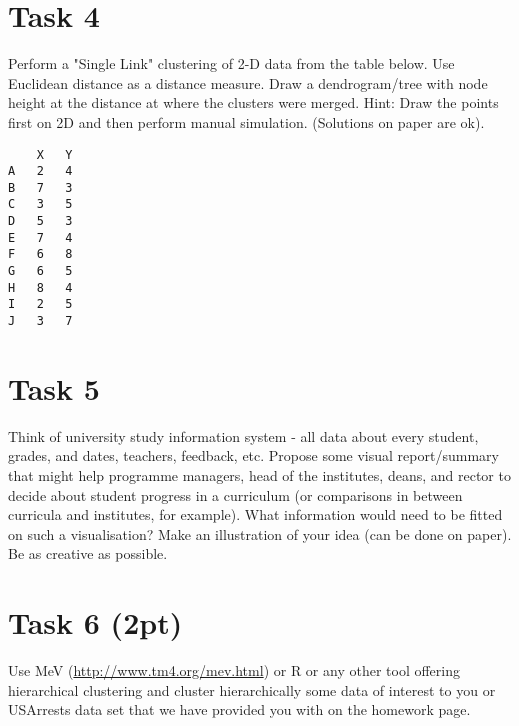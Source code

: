 \documentclass{article}
\begin{document}
\section*{Task 4}
Perform a "Single Link" clustering of 2-D data from the table below. Use Euclidean distance as a distance measure. Draw a dendrogram/tree with node height at the distance at where the clusters were merged. Hint: Draw the points first on 2D and then perform manual simulation. (Solutions on paper are ok).
\begin{lstlisting}
	X	Y
A	2	4
B	7	3
C	3	5
D	5	3
E	7	4
F	6	8
G	6	5
H	8	4
I	2	5
J	3	7
\end{lstlisting}

\section*{Task 5}
Think of university study information system - all data about every student, grades, and dates, teachers, feedback, etc. Propose some visual report/summary that might help programme managers, head of the institutes, deans, and rector to decide about student progress in a curriculum (or comparisons in between curricula and institutes, for example). What information would need to be fitted on such a visualisation? Make an illustration of your idea (can be done on paper). Be as creative as possible.

\section*{Task 6 (2pt)}
Use MeV (\url{http://www.tm4.org/mev.html}) or R or any other tool offering hierarchical clustering and cluster hierarchically some data of interest to you or USArrests data set that we have provided you with on the homework page.
\end{document}
